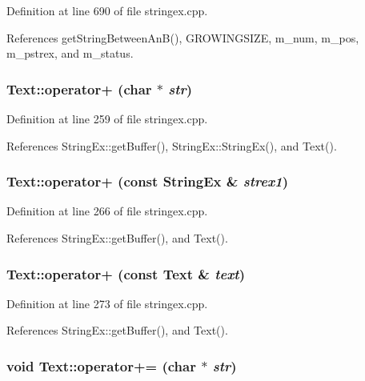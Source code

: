 Definition at line 690 of file stringex.cpp.

References getStringBetweenAnB(), GROWINGSIZE, m\_\-num, m\_\-pos, m\_\-pstrex, and m\_\-status.\hypertarget{classText_2544b46ef502514d1b08f5bd5934c6a2}{
\subsubsection[{operator+}]{ Text::operator+ (char $\ast$ {\em str})}}
\label{classText_2544b46ef502514d1b08f5bd5934c6a2}




Definition at line 259 of file stringex.cpp.

References StringEx::getBuffer(), StringEx::StringEx(), and Text().\hypertarget{classText_034badff7606ae00f30dc5b456a54ff9}{
\subsubsection[{operator+}]{ Text::operator+ (const {\bf StringEx} \& {\em strex1})}}
\label{classText_034badff7606ae00f30dc5b456a54ff9}




Definition at line 266 of file stringex.cpp.

References StringEx::getBuffer(), and Text().\hypertarget{classText_075443ef50d5b86aca405a32e8223ba6}{
\subsubsection[{operator+}]{ Text::operator+ (const {\bf Text} \& {\em text})}}
\label{classText_075443ef50d5b86aca405a32e8223ba6}




Definition at line 273 of file stringex.cpp.

References StringEx::getBuffer(), and Text().\hypertarget{classText_059126c0efdf2898e761fbc53693985b}{
\subsubsection[{operator+=}]{\setlength{\rightskip}{0pt plus 5cm}void Text::operator+= (char $\ast$ {\em str})}}
\label{classText_059126c0efdf2898e761fbc53693985b}




